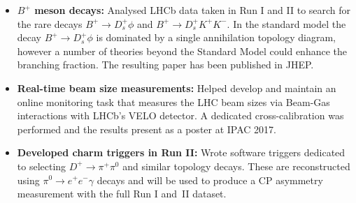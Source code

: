\documentclass[11pt,a4paper]{article}
\begin{document}
\begin{itemize}
\setlength\itemsep{0em}
\item {\bf $B^{+}$ meson decays:} Analysed LHCb data taken in Run I and II  to search for the rare decays $B^{+} \to D_{s}^{+} \phi$ and $B^{+} \to D_{s}^{+} K^{+} K^{-}$. In the standard model the decay $B^{+} \to D_{s}^{+} \phi$ is dominated by a single annihilation topology diagram, however a number of theories beyond the Standard Model could enhance the branching fraction. The resulting paper has been published in JHEP.


\item {\bf Real-time beam size measurements:} Helped develop and maintain an online monitoring task that measures the LHC beam sizes via Beam-Gas interactions with LHCb's VELO detector. A dedicated cross-calibration was performed and the results present as a poster at IPAC 2017.

\item {\bf Developed charm triggers in Run II:} Wrote software triggers dedicated to selecting $D^{+} \to \pi^{+} \pi^{0}$ and similar topology decays. These are reconstructed using $\pi^{0} \to e^{+} e^{-} \gamma$ decays and will be used to produce a CP asymmetry measurement with the full Run I and~II dataset.
\end{itemize}
\end{document}
